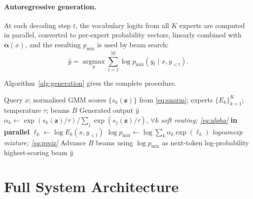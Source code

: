 \documentclass[12pt,a4paper]{article}
\begin{document}
\paragraph{Autoregressive generation.}
At each decoding step $t$, the vocabulary logits from all $K$ experts are computed in parallel, converted to per-expert probability vectors, linearly combined with $\bm{\alpha}(x)$, and the resulting $p_{\mathrm{mix}}$ is used by beam search:
\begin{equation}
    \hat{y} = \operatorname*{argmax}_{y} \sum_{t=1}^{|y|} \log p_{\mathrm{mix}}(y_t \mid x, y_{<t}).
    \label{eq:generation}
\end{equation}

Algorithm~\ref{alg:generation} gives the complete procedure.

\begin{algorithm}[t]
\caption{Soft-Routing Expert-Mixture Generation}
\label{alg:generation}
\begin{algorithmic}[1]
\Require Query $x$; normalised GMM scores $\{s_k(\mathbf{z})\}$ from \eqref{eq:snorm}; experts $\{E_k\}_{k=1}^K$; temperature $\tau$; beams $B$
\Ensure Generated output $\hat{y}$
\State $\alpha_k \gets \exp(s_k(\mathbf{z})/\tau)/\sum_j\exp(s_j(\mathbf{z})/\tau)$, $\forall k$ \hfill\textit{soft routing; \eqref{eq:alpha}}
     \textbf{in parallel}
        \State $\ell_k \gets \log E_k(x, y_{<t})$ 
    \EndFor
    \State $\log p_{\mathrm{mix}} \gets \log\!\sum_k \alpha_k \exp(\ell_k)$ \hfill\textit{logsumexp mixture; \eqref{eq:pmix}}
    \State Advance $B$ beams using $\log p_{\mathrm{mix}}$ as next-token log-probability
\EndWhile
\State \Return highest-scoring beam $\hat{y}$
\end{algorithmic}
\end{algorithm}

\section{Full System Architecture}
\label{sec:architecture}
\end{document}
